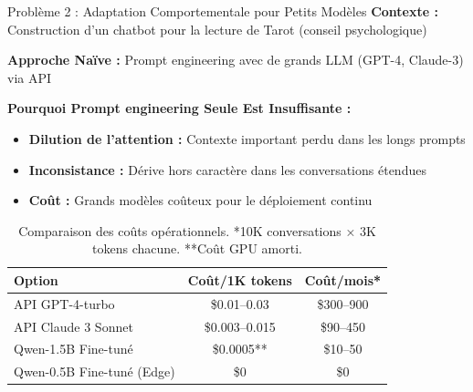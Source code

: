 \documentclass[11pt, aspectratio=169, xcolor=table]{beamer}
\begin{document}
\begin{frame}{Problème 2 : Adaptation Comportementale pour Petits Modèles}
    \footnotesize
    \textbf{Contexte :} Construction d'un chatbot pour la lecture de Tarot (conseil psychologique)
    
    \vspace{0.3cm}
    \textbf{Approche Naïve :} Prompt engineering avec de grands LLM (GPT-4, Claude-3) via API
    
    \vspace{0.3cm}
    \textbf{Pourquoi Prompt engineering Seule Est Insuffisante :}
    \begin{itemize}
        \item \textbf{Dilution de l'attention :} Contexte important perdu dans les longs prompts
        \item \textbf{Inconsistance :} Dérive hors caractère dans les conversations étendues
        \item \textbf{Coût :} Grands modèles coûteux pour le déploiement continu
    \end{itemize}

    \vspace{0.3cm}
    \begin{table}[H]
        \centering
        \caption{Comparaison des coûts opérationnels. *10K conversations × 3K tokens chacune. **Coût GPU amorti.}
        \small
        \begin{tabular}{|l|c|c|}
            \hline
            \textbf{Option} & \textbf{Coût/1K tokens} & \textbf{Coût/mois*} \\
            \hline
            API GPT-4-turbo & \$0.01--0.03 & \$300--900 \\
            API Claude 3 Sonnet & \$0.003--0.015 & \$90--450 \\
            Qwen-1.5B Fine-tuné & \$0.0005** & \$10--50 \\
            Qwen-0.5B Fine-tuné (Edge) & \$0 & \$0  \\
            \hline
        \end{tabular}
    \end{table}
\end{frame}
\end{document}
